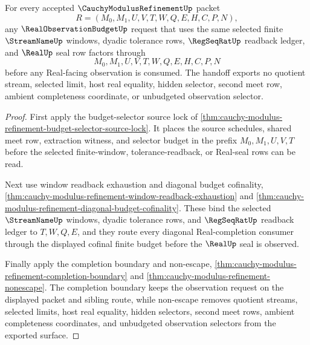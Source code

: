 \begin{theorem}
\label{thm:cauchy-modulus-refinement-real-observation-budget-handoff}
For every accepted $\CauchyModulusRefinementUp$ packet
$$
R=(M_0,M_1,U,V,T,W,Q,E,H,C,P,N),
$$
any $\RealObservationBudgetUp$ request that uses the same selected finite $\StreamNameUp$ windows, dyadic tolerance rows, $\RegSeqRatUp$ readback ledger, and $\RealUp$ seal row factors through
$$
M_0,M_1,U,V,T,W,Q,E,H,C,P,N
$$
before any Real-facing observation is consumed. The handoff exports no quotient stream, selected limit, host real equality, hidden selector, second meet row, ambient completeness coordinate, or unbudgeted observation selector.
\end{theorem}
\begin{proof}
First apply the budget-selector source lock of \autoref{thm:cauchy-modulus-refinement-budget-selector-source-lock}. It places the source schedules, shared meet row, extraction witness, and selector budget in the prefix $M_0,M_1,U,V,T$ before the selected finite-window, tolerance-readback, or Real-seal rows can be read.

Next use window readback exhaustion and diagonal budget cofinality, \autoref{thm:cauchy-modulus-refinement-window-readback-exhaustion} and \autoref{thm:cauchy-modulus-refinement-diagonal-budget-cofinality}. These bind the selected $\StreamNameUp$ windows, dyadic tolerance rows, and $\RegSeqRatUp$ readback ledger to $T,W,Q,E$, and they route every diagonal Real-completion consumer through the displayed cofinal finite budget before the $\RealUp$ seal is observed.

Finally apply the completion boundary and non-escape, \autoref{thm:cauchy-modulus-refinement-completion-boundary} and \autoref{thm:cauchy-modulus-refinement-nonescape}. The completion boundary keeps the observation request on the displayed packet and sibling route, while non-escape removes quotient streams, selected limits, host real equality, hidden selectors, second meet rows, ambient completeness coordinates, and unbudgeted observation selectors from the exported surface.
\end{proof}

